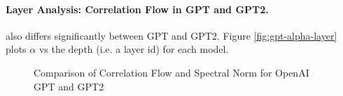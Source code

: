 \paragraph{Layer Analysis: Correlation Flow in GPT and GPT2.} 

also differs significantly between GPT and GPT2.
Figure \ref{fig:gpt-alpha-layer} plots $\alpha$ vs the depth (i.e. a layer id) for each model.


\begin{figure}[t]
    \centering

    \caption{Comparison of Correlation Flow and Spectral Norm for OpenAI GPT and GPT2   }
    \label{fig:gpt-alpha-layers}
\end{figure}




